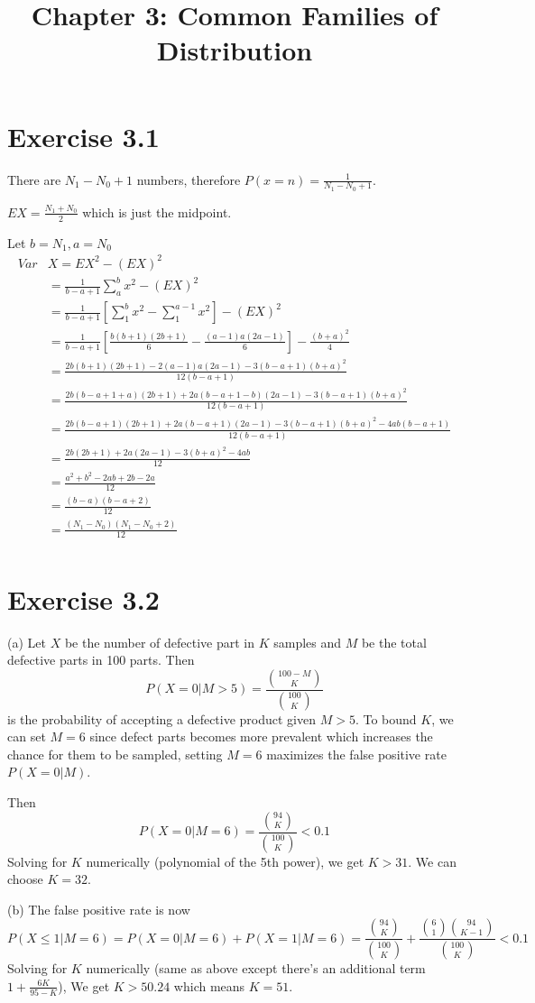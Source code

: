 \documentclass[12pt]{article}
\title{Chapter 3: Common Families of Distribution}
\begin{document}
\maketitle

\section*{Exercise 3.1}
There are $N_1 - N_0 +1$ numbers, therefore $P(x = n) = \frac{1}{N_1-N_0+1}$.

$EX = \frac{N_1+N_0}{2}$ which is just the midpoint.

Let $b=N_1, a=N_0$
$$
\begin{aligned}
Var &X=EX^2 - (EX)^2 \\
    &= \frac{1}{b-a+1} \sum^{b}_{a}x^2  - (EX)^2  \\
   &= \frac{1}{b-a+1}\left[\sum^{b}_{1}x^2 - \sum^{a-1}_{1}x^2 \right] - (EX)^2 \\
   &= \frac{1}{b-a+1}\left[\frac{b(b +1)(2b+1)}{6} - \frac{(a-1)a(2a-1)}{6}\right] -  \frac{(b+a)^2}{4} \\
   &= \frac{2b(b +1)(2b+1)- 2(a-1)a(2a-1)-3(b-a+1)(b+a)^2}{12(b-a+1)} \\
   &= \frac{2b(b -a +1 + a)(2b+1) + 2a(b - a + 1 - b)(2a-1)-3(b-a+1)(b+a)^2}{12(b-a+1)} \\
   &= \frac{2b(b -a +1)(2b+1) + 2a(b - a + 1)(2a-1)-3(b-a+1)(b+a)^2 -4ab(b-a+1)}{12(b-a+1)} \\
   &= \frac{2b(2b+1) + 2a(2a-1)-3(b+a)^2 -4ab}{12} \\
   &= \frac{a^2+b^2 -2ab +2b-2a}{12} \\
   &= \frac{(b-a)(b-a+2)}{12} \\
   &= \frac{(N_1-N_0)(N_1-N_0+2)}{12} \\
\end{aligned}
$$

\section*{Exercise 3.2}
(a)
Let $X$ be the number of defective part in $K$ samples and $M$ be the total defective parts in 100 parts. Then
$$P(X=0 | M > 5) = \frac{{100 -M \choose K}}{{100 \choose K}}$$ 
is the probability of accepting a defective product given $M > 5$. 
To bound $K$, we can set $M = 6$ since defect parts becomes more prevalent which increases the chance for them to be sampled, setting $M=6$ maximizes the false positive rate $P(X=0|M)$.

Then
$$P(X=0 | M=6) = \frac{{94 \choose K}}{{100 \choose K}} < 0.1$$
Solving for $K$ numerically (polynomial of the 5th power), we get $K >31$. We can choose $K=32$.

(b)
The false positive rate is now 
$$P(X\leq 1 | M = 6) = P(X=0|M=6) + P(X=1|M=6)=  \frac{{94 \choose K}}{{100 \choose K}} +  \frac{{6 \choose 1}{94 \choose K-1}}{{100 \choose K}} < 0.1 $$
Solving for $K$ numerically (same as above except there's an additional term $1 + \frac{6K}{95-K}$), We get $K > 50.24$ which means $K=51$.
\end{document}
